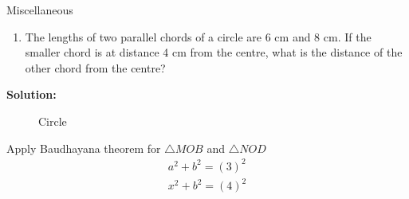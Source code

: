\documentclass{beamer}
\newcounter{saveenumi}
\newcommand{\conti}{\setcounter{enumi}{\value{saveenumi}}}
\begin{document}
\begin{frame}{Miscellaneous}
\begin{enumerate}
\conti
\item The lengths of two parallel chords of a circle are 6 cm and 8 cm. If the smaller chord is
at distance 4 cm from the centre, what is the
distance of the other chord from the centre?
\end{enumerate}
\textbf{Solution:} 
\begin{figure}[!ht]
\resizebox{0.45\linewidth}{!}
{

}
\caption{Circle}
\label{fig:foo}
\end{figure}
\end{frame}
\begin{frame}
Apply Baudhayana theorem for $\triangle{MOB}$ and $\triangle{NOD}$
\begin{align*}
a^2+b^2=(3)^2 \\
x^2+b^2=(4)^2
\end{align*}

\end{frame}
\end{document}
